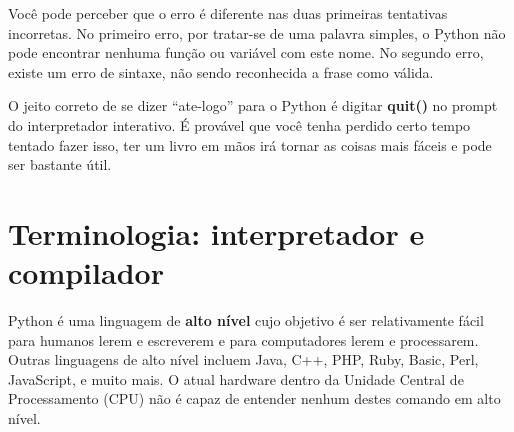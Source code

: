 %
%

Você pode perceber que o erro é diferente nas duas primeiras
tentativas incorretas. No primeiro erro, por tratar-se de uma
palavra simples, o Python não pode encontrar nenhuma função ou
variável com este nome. No segundo erro, existe um erro de sintaxe,
não sendo reconhecida a frase como válida.
%

O jeito correto de se dizer ``ate-logo'' para o Python é
digitar {\bf quit()} no prompt do interpretador interativo.
É provável que você tenha perdido certo tempo tentado fazer isso,
ter um livro em mãos irá tornar as coisas mais fáceis e
pode ser bastante útil.
%

\section{Terminologia: interpretador e compilador}
%

Python é uma linguagem de {\bf alto nível} cujo objetivo é ser
relativamente fácil para humanos lerem e escreverem e para computadores
lerem e processarem. Outras linguagens de alto nível incluem Java, C++,
PHP, Ruby, Basic, Perl, JavaScript, e muito mais. O atual hardware
dentro da Unidade Central de Processamento (CPU) não é capaz de entender
nenhum destes comando em alto nível.
%

